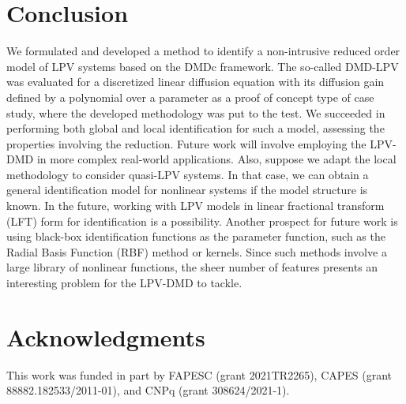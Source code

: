 
\section{Conclusion} \label{sec:conclusion}

We formulated and developed a method to identify a non-intrusive reduced order model of LPV systems based on the DMDc framework.
%
The so-called DMD-LPV was evaluated for a discretized linear diffusion equation with its diffusion gain defined by a polynomial over a parameter as a proof of concept type of case study, where the developed methodology was put to the test.
%
We succeeded in performing both global and local identification for such a model, assessing the properties involving the reduction.
%
Future work will involve employing the LPV-DMD in more complex real-world applications.
%
Also, suppose we adapt the local methodology to consider quasi-LPV systems. In that case, we can obtain a general identification model for nonlinear systems if the model structure is known.
%
In the future, working with LPV models in linear fractional transform (LFT) form for identification is a possibility.
%
Another prospect for future work is using black-box identification functions as the parameter function, such as the Radial Basis Function (RBF) method or kernels.
%
Since such methods involve a large library of nonlinear functions, the sheer number of features presents an interesting problem for the LPV-DMD to tackle.


\section*{Acknowledgments}
This work was funded in part by FAPESC (grant 2021TR2265), CAPES  (grant 88882.182533/2011-01), and CNPq (grant 308624/2021-1). 
